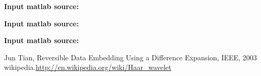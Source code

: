 \documentclass[a4paper,12pt]{article}%
\begin{document}
\textbf{\textcolor[rgb]{0.98,0.00,0.00}{Input matlab source:}}


\textbf{\textcolor[rgb]{0.98,0.00,0.00}{Input matlab source:}}


\textbf{\textcolor[rgb]{0.98,0.00,0.00}{Input matlab source:}}


\begin{thebibliography}{99}
 Jun Tian, Reversible Data Embedding Using a Difference Expansion, IEEE, 2003
 wikipedia.\url{http://en.wikipedia.org/wiki/Haar_wavelet}
\end{thebibliography}
\end{document}
